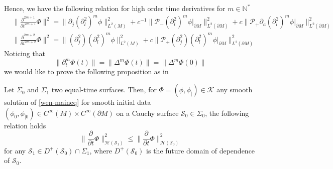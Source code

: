 Hence, we have the following relation for high order time derivatives for $m\in \mathbb{N}^*$
\begin{equation*}
\begin{split}
& \big\|\frac{\partial^{2m+1}}{\partial t^{2m+1}} \Phi \big\|^2 = 
\|\partial_j (\partial_l^2)^{m}\phi \|^2_{L^2 (M)} 
+ c^{-1} \| \mathcal{P}_- (\partial_l^2)^{m}\phi\vert_{\partial M} \|^2_{L^2(\partial M)}
+ c \| \mathcal{P}_+ \partial_a (\partial_l^2)^{m}\phi\vert_{\partial M} \|^2_{L^2(\partial M)}
\\
& \big\|\frac{\partial^{2m+2}}{\partial t^{2m+2}} \Phi \big\|^2 = 
 \|(\partial^2_j)(\partial_l^2)^{m} \phi \|^2_{L^2 (M)} 
+ c \| \mathcal{P}_+ (\partial_j^2) (\partial_l^2)^{m}\phi\vert_{\partial M} \|^2_{L^2(\partial M)}
\end{split}
\end{equation*}
Noticing that
\begin{equation*}
\big\|\partial_t^m \Phi(t) \big\|= 
\big\|\Delta^m\Phi(t) \big\| =
\big\|\Delta^m \Phi(0) \big\|
\end{equation*}
we would like to prove the following proposition as in~\cite{Zahn2016}
\begin{proposition}\label{wen-propcau}
Let $\Sigma_0$ and $\Sigma_1$ two equal-time surfaces. 
Then, for $\Phi = (\phi, \phi_|) \in \mathcal{K}$ any smooth solution of \cref{wen-maineq} for smooth initial data $(\phi_0, \phi_{|0}) \in C^\infty(M) \times C^\infty(\partial M)$ on a Cauchy surface $\mathcal{S}_0 \in \Sigma_0$,
the following relation holds
\begin{equation}\label{wen-causal}
\big\| \frac{\partial}{\partial t} \Phi \big\|_{\mathcal{H}(\mathcal{S}_1)}^2
\leq 
\big\| \frac{\partial}{\partial t} \Phi \big\|_{\mathcal{H}(\mathcal{S}_0)}^2
\end{equation}
for any $\mathcal{S}_1 \in D^+(\mathcal{S}_0)\cap\Sigma_1$, where $D^+(\mathcal{S}_0)$ is the future domain of dependence of $\mathcal{S}_0$.
\end{proposition}
